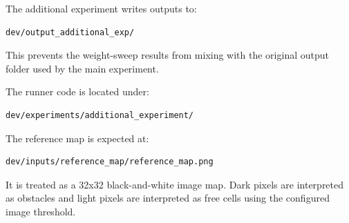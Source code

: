 \documentclass[11pt,a4paper]{article}
\begin{document}
The additional experiment writes outputs to:

\begin{verbatim}
dev/output_additional_exp/
\end{verbatim}

This prevents the weight-sweep results from mixing with the original output folder used by the main experiment.

The runner code is located under:

\begin{verbatim}
dev/experiments/additional_experiment/
\end{verbatim}

The reference map is expected at:

\begin{verbatim}
dev/inputs/reference_map/reference_map.png
\end{verbatim}

It is treated as a 32x32 black-and-white image map. Dark pixels are interpreted as obstacles and light pixels are interpreted as free cells using the configured image threshold.
\end{document}
